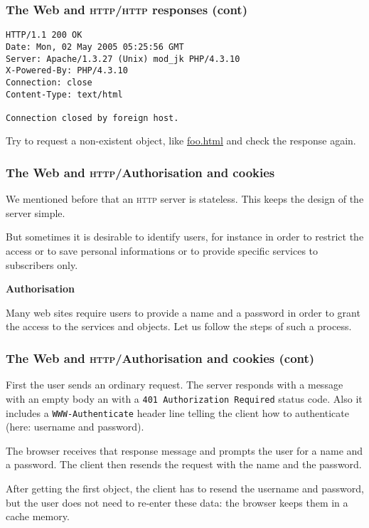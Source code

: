%
\begin{frame}[containsverbatim]
\frametitle{The Web and \textsc{http}/\textsc{http} responses (cont)}

{\small
\begin{verbatim}
HTTP/1.1 200 OK
Date: Mon, 02 May 2005 05:25:56 GMT
Server: Apache/1.3.27 (Unix) mod_jk PHP/4.3.10
X-Powered-By: PHP/4.3.10
Connection: close
Content-Type: text/html

Connection closed by foreign host.
\end{verbatim}
}
Try to request a non-existent object, like \url{foo.html} and check
the response again.

\end{frame}

%
\begin{frame}
\frametitle{The Web and \textsc{http}/Authorisation and cookies}

We mentioned before that an \textsc{http} server is stateless. This
keeps the design of the server simple.

\bigskip

But sometimes it is desirable to identify users, for instance in order
to restrict the access or to save personal informations or to provide
specific services to subscribers only.

\bigskip

\textbf{Authorisation}

Many web sites require users to provide a name and a password in order
to grant the access to the services and objects. Let us follow the
steps of such a process.

\end{frame}

%
\begin{frame}[containsverbatim]
\frametitle{The Web and \textsc{http}/Authorisation and cookies (cont)}

First the user sends an ordinary request. The server responds with a
message with an empty body an with a \verb+401 Authorization Required+
status code. Also it includes a \verb+WWW-Authenticate+ header line
telling the client how to authenticate (here: username and password).

\bigskip

The browser receives that response message and prompts the user for a
name and a password. The client then resends the request with the name
and the password.

\bigskip

After getting the first object, the client has to resend the username
and password, but the user does not need to re-enter these data: the
browser keeps them in a cache memory.

\end{frame}

